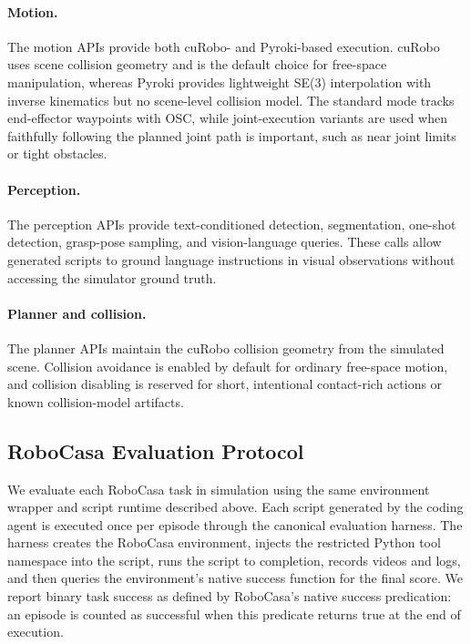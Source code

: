 \paragraph{Motion.}
The motion APIs provide both cuRobo- and Pyroki-based execution. cuRobo uses scene collision geometry and is the default choice for free-space manipulation, whereas Pyroki provides lightweight SE(3) interpolation with inverse kinematics but no scene-level collision model. The standard mode
tracks end-effector waypoints with OSC, while joint-execution variants are used when faithfully following the planned joint path is important, such as near joint limits or tight obstacles.

\paragraph{Perception.}
The perception APIs provide text-conditioned detection, segmentation, one-shot detection,
grasp-pose sampling, and vision-language queries. These calls allow generated scripts to ground
language instructions in visual observations without accessing the simulator ground truth.

\paragraph{Planner and collision.}
The planner APIs maintain the cuRobo collision geometry from the simulated scene. Collision
avoidance is enabled by default for ordinary free-space motion, and collision disabling is reserved
for short, intentional contact-rich actions or known collision-model artifacts.

\subsection{RoboCasa Evaluation Protocol}
\label{subsec:robocasa-eval-protocol}

We evaluate each RoboCasa task in simulation using the same environment wrapper
and script runtime described above. Each script generated by the coding agent is executed
once per episode through the canonical evaluation harness. The harness creates
the RoboCasa environment, injects the restricted Python tool namespace into the
script, runs the script to completion, records videos and logs, and then queries
the environment's native success function for the final score. We report binary
task success as defined by RoboCasa's native success predication: an episode is
counted as successful when this predicate returns true at the end of execution.

